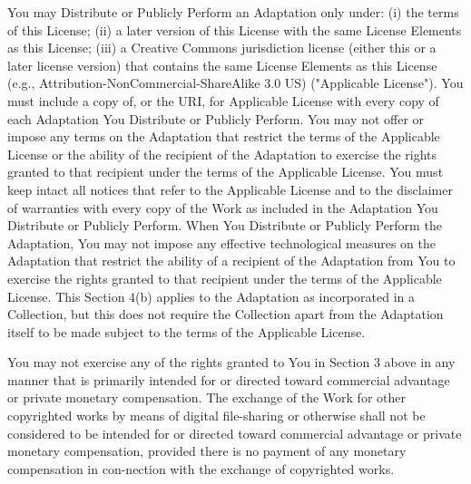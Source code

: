     \item
    You may Distribute or Publicly Perform an Adaptation only under: (i) the terms of this License; (ii) a later version of this License with the same License Elements as this License; (iii) a Creative Commons jurisdiction license (either this or a later license version) that contains the same License Elements as this License (e.g., Attribution-NonCommercial-ShareAlike 3.0 US) ("Applicable License"). You must include a copy of, or the URI, for Applicable License with every copy of each Adaptation You Distribute or Publicly Perform. You may not offer or impose any terms on the Adaptation that restrict the terms of the Applicable License or the ability of the recipient of the Adaptation to exercise the rights granted to that recipient under the terms of the Applicable License. You must keep intact all notices that refer to the Applicable License and to the disclaimer of warranties with every copy of the Work as included in the Adaptation You Distribute or Publicly Perform. When You Distribute or Publicly Perform the Adaptation, You may not impose any effective technological measures on the Adaptation that restrict the ability of a recipient of the Adaptation from You to exercise the rights granted to that recipient under the terms of the Applicable License. This Section 4(b) applies to the Adaptation as incorporated in a Collection, but this does not require the Collection apart from the Adaptation itself to be made subject to the terms of the Applicable License.

    \item
    You may not exercise any of the rights granted to You in Section 3 above in any manner that is primarily intended for or directed toward commercial advantage or private monetary compensation. The exchange of the Work for other copyrighted works by means of digital file-sharing or otherwise shall not be considered to be intended for or directed toward commercial advantage or private monetary compensation, provided there is no payment of any monetary compensation in con-nection with the exchange of copyrighted works.

